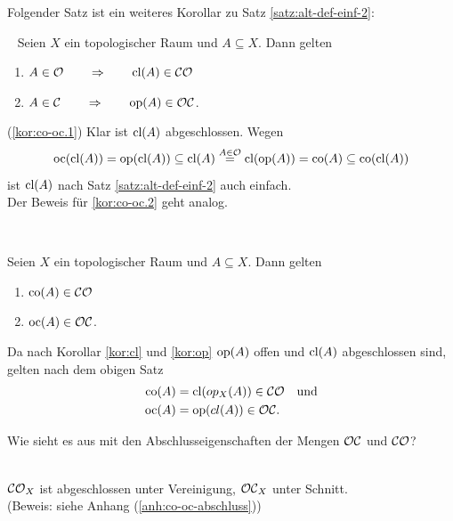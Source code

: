    Folgender Satz ist ein weiteres Korollar zu Satz \ref{satz:alt-def-einf-2}:
    \begin{kor} \label{kor:co-oc} \ \vspace{8pt}
        \noindent
        Seien $X$ ein topologischer Raum und $A \subseteq X$. Dann gelten
        \begin{enumerate}
            \item \label{kor:co-oc.1} $A \in \mathcal{O} \quad \quad \Rightarrow \quad \quad \text{cl}(A) \in \mathcal{CO}$
            \item \label{kor:co-oc.2} $A \in \mathcal{C} \quad \quad \Rightarrow \quad \quad \text{op}(A) \in \mathcal{OC}$.
        \end{enumerate}
    \end{kor}
    \begin{bew}
        (\ref{kor:co-oc.1}) Klar ist $\text{cl}(A)$ abgeschlossen. Wegen
        $$\text{oc}(\text{cl}(A)) = \text{op}(\text{cl}(A)) \subseteq \text{cl}(A) 
        \overset{A \in \mathcal{O}}{=} \text{cl}(\text{op}(A)) = \text{co}(A) \subseteq \text{co}(\text{cl}(A)) $$
        ist $\text{cl}(A)$ nach Satz \ref{satz:alt-def-einf-2} auch einfach.\\
        Der Beweis für \ref{kor:co-oc.2} geht analog.
    \end{bew}

    \begin{kor} \label{kor:co-CO-oc-OC} \ \vspace{8pt}

        \noindent
        Seien $X$ ein topologischer Raum und $A \subseteq X$. Dann gelten
        \begin{enumerate}
            \item \label{kor:co-CO-oc-OC.1} $\text{co}(A) \in \mathcal{CO}$
            \item \label{kor:co-CO-oc-OC.2} $\text{oc}(A) \in \mathcal{OC}$.
        \end{enumerate}
    \end{kor}
    \begin{bew}
    Da nach Korollar \ref{kor:cl} und \ref{kor:op} $\text{op}(A)$ offen und $\text{cl}(A)$ abgeschlossen sind, gelten nach dem obigen Satz
        \begin{align*}
            \text{co}(A) &= \text{cl}(op_X(A)) \in \mathcal{CO} \quad \text{und}\\
            \text{oc}(A) &= \text{op}(cl(A)) \in \mathcal{OC}.
        \end{align*}
    \end{bew}
    
    
    Wie
    sieht es aus mit den Abschlusseigenschaften der Mengen $\mathcal{OC}$ und $\mathcal{CO}$?
    \begin{satz}\label{kor:co-oc-abschluss}\ \\
        $\mathcal{CO}_X$ ist abgeschlossen unter Vereinigung, $\mathcal{OC}_X$ unter Schnitt.\\
        (Beweis: siehe Anhang (\ref{anh:co-oc-abschluss}))
    \end{satz}
    
